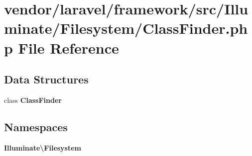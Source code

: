 \section{vendor/laravel/framework/src/\+Illuminate/\+Filesystem/\+Class\+Finder.php File Reference}
\label{_class_finder_8php}
\subsection*{Data Structures}
\begin{DoxyCompactItemize}
\item 
class {\bf Class\+Finder}
\end{DoxyCompactItemize}
\subsection*{Namespaces}
\begin{DoxyCompactItemize}
\item 
 {\bf Illuminate\textbackslash{}\+Filesystem}
\end{DoxyCompactItemize}

